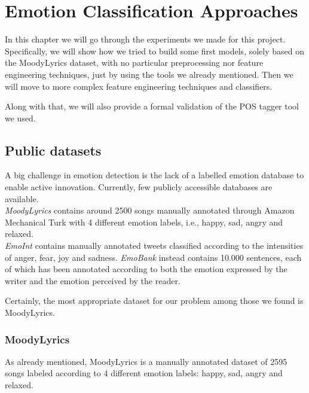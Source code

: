 \chapter{Emotion Classification Approaches}

In this chapter we will go through the experiments we made for this
project. Specifically, we will show how we tried to build some first models, solely 
based on the MoodyLyrics dataset, with no particular preprocessing nor feature
engineering techniques, just by using the tools we already mentioned. Then we will
move to more complex feature engineering techniques and classifiers.

Along with that, we will also provide a formal validation of the POS tagger tool we used.

\section{Public datasets}
A big challenge in emotion detection is the lack of a labelled emotion database to enable active innovation. Currently, few publicly accessible databases are available.\\\textit{MoodyLyrics}\cite{moodylyrics} contains around 2500 songs manually annotated through Amazon Mechanical Turk with 4 different emotion labels, i.e., happy, sad, angry and relaxed.\\
\textit{EmoInt}\cite{emoint} contains manually annotated tweets classified according to the intensities of anger, fear, joy and sadness. \textit{EmoBank}\cite{emobank} instead contains 10.000 sentences, each of which has been annotated according to both the emotion expressed by the writer and the emotion perceived by the reader.

Certainly, the most appropriate dataset for our problem among those we found is MoodyLyrics.

\subsection{MoodyLyrics}

As already mentioned, MoodyLyrics is a manually annotated dataset of 2595 songs labeled according to 4
different emotion labels: happy, sad, angry and relaxed.

